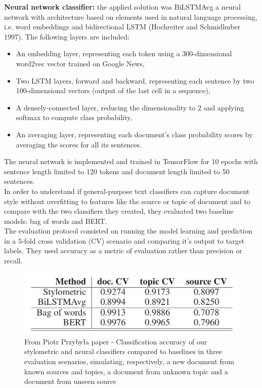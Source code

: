 \documentclass[10pt, english]{report}
\begin{document}
\textbf{Neural network classifier:} the applied solution was BiLSTMAvg a neural network with architecture based on elements used in natural language processing, i.e. word embeddings \cite{mikolov2013efficient} and bidirectional LSTM (Hochreiter and Schmidhuber 1997). The following layers are included:
	\begin{itemize}
	\item An embedding layer, representing each token using a 300-dimensional word2vec vector trained on Google News,
	\item Two LSTM layers, forward and backward, representing each sentence by two 100-dimensional vectors (output of the last cell in a sequence),
	\item A densely-connected layer, reducing the dimensionality to 2 and applying softmax to compute class probability,
	\item An averaging layer, representing each document’s class probability scores by averaging the scores for all its sentences.
	\end{itemize}
The neural network is implemented and trained in TensorFlow for 10 epochs with sentence length limited to 120 tokens and document length limited to 50 sentences.\\

In order to understand if general-purpose text classifiers can capture document style without overfitting to features like the source or topic of document and to compare with the two classifiers they created, they evaluated two baseline models: bag of words and BERT.\\

The evaluation protocol consisted on running the model learning and prediction in a 5-fold cross validation (CV) scenario and comparing it's output to target labels. They used accuracy as a metric of evaluation rather than precision or recall.

\begin{figure}[H]
	\centering
	\includegraphics[scale=0.3]{img/styled_model_result.png}
	\caption{From Piotr Przybyła paper - Classiﬁcation accuracy of our stylometric and neural classiﬁers compared to baselines in three evaluation scenarios, simulating, respectively, a new document from known sources and topics, a document from unknown topic and a document from unseen source}
\end{figure}
\end{document}
